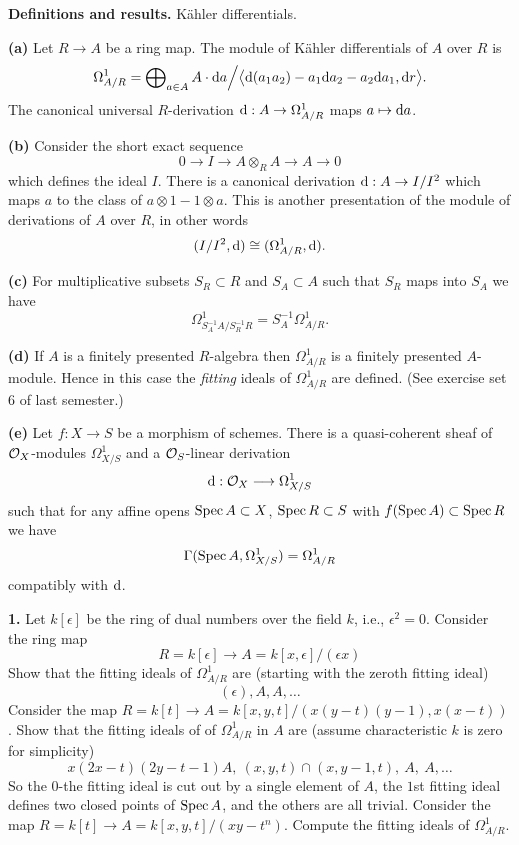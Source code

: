 \bigskip\noindent
{\bf Definitions and results.} K\"ahler differentials.
\item{\bf (a)} Let $R \to A$ be a ring map. The module of K\"ahler
differentials of $A$ over $R$ is 
$$
\Omega^1_{A/R} = \bigoplus\nolimits_{a\in A} A \cdot {\rm d}a \Big/
\big\langle {\rm d}(a_1a_2)-a_1{\rm d}a_2-a_2{\rm d}a_1, {\rm d}r\big\rangle.
$$
The canonical universal $R$-derivation ${\rm d} : A \to \Omega^1_{A/R}$ 
maps $a\mapsto {\rm d}a$.
\item{\bf (b)} Consider the short exact sequence
$$
0 \to I \to A\otimes_R A \to A \to 0
$$
which defines the ideal $I$. There is a canonical derivation
${\rm d} : A \to I/I^2$ which maps $a$ to the class of
$a\otimes 1 - 1 \otimes a$. This is another presentation of
the module of derivations of $A$ over $R$, in other words
$$
(I/I^2, {\rm d}) \cong (\Omega^1_{A/R}, {\rm d}).
$$
\item{\bf (c)} For multiplicative subsets $S_R \subset R$ and
$S_A \subset A$ such that $S_R$ maps into $S_A$ we have
$$
\Omega^1_{S_A^{-1}A / S_R^{-1}R} =
S_A^{-1}\Omega^1_{A/R}.
$$
\item{\bf (d)} If $A$ is a finitely presented $R$-algebra then
$\Omega^1_{A/R}$ is a finitely presented $A$-module. Hence in
this case the {\it fitting} ideals of $\Omega^1_{A/R}$ are defined.
(See exercise set 6 of last semester.)
\item{\bf (e)} Let $f : X \to S$ be a morphism of schemes. There is
a quasi-coherent sheaf of ${\cal O}_X$-modules $\Omega^1_{X/S}$
and a ${\cal O}_S$-linear derivation 
$$
{\rm d} : {\cal O}_X \longrightarrow \Omega^1_{X/S}
$$
such that for any affine opens $\mathop{\rm Spec} A \subset X$, $\mathop{\rm Spec} R \subset S$
with $f(\mathop{\rm Spec} A) \subset \mathop{\rm Spec} R$ we have
$$
\Gamma(\mathop{\rm Spec} A, \Omega^1_{X/S}) = \Omega^1_{A/R}
$$
compatibly with ${\rm d}$.

\medskip\item{\bf 1.} Let $k[\epsilon]$ be the ring of dual numbers
over the field $k$, i.e., $\epsilon^2=0$.
 Consider the ring map
$$
R = k[\epsilon] \to A = k[x,\epsilon]/(\epsilon x)
$$
Show that the fitting ideals of $\Omega^1_{A/R}$ are (starting with the
zeroth fitting ideal)
$$
(\epsilon), A, A,\ldots
$$
 Consider the map $R=k[t] \to 
A=k[x,y,t]/(x(y-t)(y-1),x(x-t))$. Show that the fitting ideals of
of $\Omega^1_{A/R}$ in $A$ are (assume characteristic $k$ is zero
for simplicity)
$$
x(2x-t)(2y-t-1)A,\ (x,y,t)\cap (x,y-1,t),\ A,\ A,\ldots
$$
So the $0$-the fitting ideal is cut out by a single element of $A$,
the $1$st fitting ideal defines two closed points of $\mathop{\rm Spec} A$, and
the others are all trivial.
 Consider the map $R=k[t] \to A=k[x,y,t]/(xy-t^n)$.
Compute the fitting ideals of $\Omega^1_{A/R}$.

